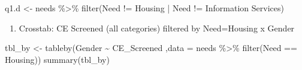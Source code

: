 \documentclass[
]{article}
\newenvironment{Shaded}{\begin{snugshade}}{\end{snugshade}}
\newcommand{\AttributeTok}[1]{\textcolor[rgb]{0.77,0.63,0.00}{#1}}
\newcommand{\FunctionTok}[1]{\textcolor[rgb]{0.00,0.00,0.00}{#1}}
\newcommand{\NormalTok}[1]{#1}
\newcommand{\OtherTok}[1]{\textcolor[rgb]{0.56,0.35,0.01}{#1}}
\newcommand{\SpecialCharTok}[1]{\textcolor[rgb]{0.00,0.00,0.00}{#1}}
\newcommand{\StringTok}[1]{\textcolor[rgb]{0.31,0.60,0.02}{#1}}
\providecommand{\tightlist}{%
  \setlength{\itemsep}{0pt}\setlength{\parskip}{0pt}}
\begin{document}
\begin{Shaded}
\begin{Highlighting}[]
\NormalTok{q1.d }\OtherTok{\textless{}{-}}\NormalTok{ needs }\SpecialCharTok{\%\textgreater{}\%} \FunctionTok{filter}\NormalTok{(Need }\SpecialCharTok{!=} \StringTok{\textquotesingle{}Housing\textquotesingle{}} \SpecialCharTok{|}\NormalTok{ Need }\SpecialCharTok{!=} \StringTok{\textquotesingle{}Information Services\textquotesingle{}}\NormalTok{)}
\end{Highlighting}
\end{Shaded}

\begin{enumerate}
\def\labelenumi{\alph{enumi}.}
\setcounter{enumi}{4}
\tightlist
\item
  Crosstab: CE Screened (all categories) filtered by Need=Housing x
  Gender
\end{enumerate}

\begin{Shaded}
\begin{Highlighting}[]
\NormalTok{tbl\_by }\OtherTok{\textless{}{-}} \FunctionTok{tableby}\NormalTok{(Gender }\SpecialCharTok{\textasciitilde{}}\NormalTok{ CE\_Screened ,}\AttributeTok{data =}\NormalTok{ needs }\SpecialCharTok{\%\textgreater{}\%} \FunctionTok{filter}\NormalTok{(Need }\SpecialCharTok{==} \StringTok{\textquotesingle{}Housing\textquotesingle{}}\NormalTok{))}
\FunctionTok{summary}\NormalTok{(tbl\_by)}
\end{Highlighting}
\end{Shaded}
\end{document}
